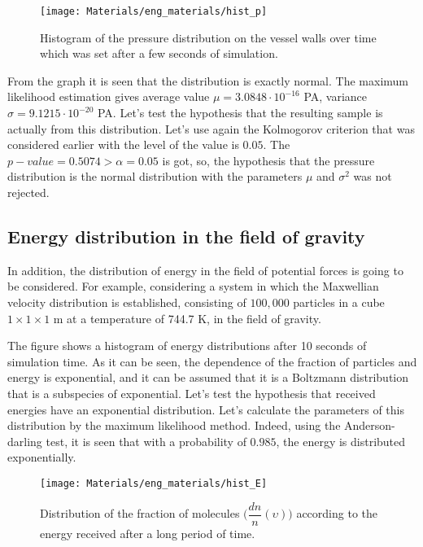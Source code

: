\documentclass[12pt,twoside]{article}
\begin{document}
    \begin{figure}[H]
        \centering
        {\texttt{[image: Materials/eng\_materials/hist\_p]}}
        \caption{Histogram of the pressure distribution on the vessel walls over time which was set after a few seconds of simulation.}
    \end{figure}

    From the graph it is seen that the distribution is exactly normal. The maximum likelihood estimation gives
    average value $\mu = 3.0848 \cdot 10^{-16}$ PA, variance $\sigma = 9.1215 \cdot 10^{-20}$ PA. Let's test the hypothesis that
    the resulting sample is actually from this distribution. Let's use again the Kolmogorov criterion that was considered earlier with the level of
    the value is $0.05$. The $p-value = 0.5074 > \alpha = 0.05$ is got, so, the hypothesis that the pressure distribution is
    the normal distribution with the parameters $\mu$ and $\sigma^2$ was not rejected.

    \subsection{Energy distribution in the field of gravity}

    In addition, the distribution of energy in the field of potential forces is going to be considered.
    For example, considering a system in which the Maxwellian velocity distribution is established, consisting of $100,000$ particles in a cube $1 \times 1 \times 1$ m at a temperature of 744.7 K, in the field of gravity.

    \indent The figure shows a histogram of energy distributions after 10 seconds of simulation time. As it can be seen,
    the dependence of the fraction of particles and energy is exponential, and it can be assumed that it is a Boltzmann distribution that
    is a subspecies of exponential. Let's test the hypothesis that received energies have an exponential distribution.
    Let’s calculate the parameters of this distribution by the maximum likelihood method. Indeed, using the Anderson-darling test, it is seen that with a probability of $0.985$, the energy is distributed
    exponentially.

    \begin{figure}[H]
        \centering
        {\texttt{[image: Materials/eng\_materials/hist\_E]}}
        \caption{Distribution of the fraction of molecules $\Big(\dfrac{dn}{n} (\upsilon) \Big)$ 
        according to the energy received after a long period of time.}
    \end{figure}
\end{document}

